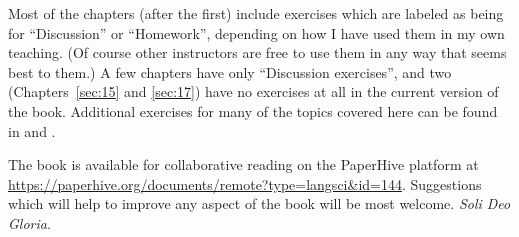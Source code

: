 \begin{refsection}
Most of the chapters (after the first) include exercises which are labeled as being for “Discussion” or “Homework”, depending on how I have used them in my own teaching. (Of course other instructors are free to use them in any way that seems best to them.) A few chapters have only “Discussion exercises”, and two (Chapters~\ref{sec:15} and \ref{sec:17}) have no exercises at all in the current version of the book. Additional exercises for many of the topics covered here can be found in \citet{Saeed2009} and \citet{Kearns2000}.


The book is available for collaborative reading on the PaperHive platform at \url{https://paperhive.org/documents/remote?type=langsci&id=144}. Suggestions which will help to improve any aspect of the book will be most welcome. \textit{Soli Deo Gloria}.

\printbibliography[heading=subbibliography]
\end{refsection}